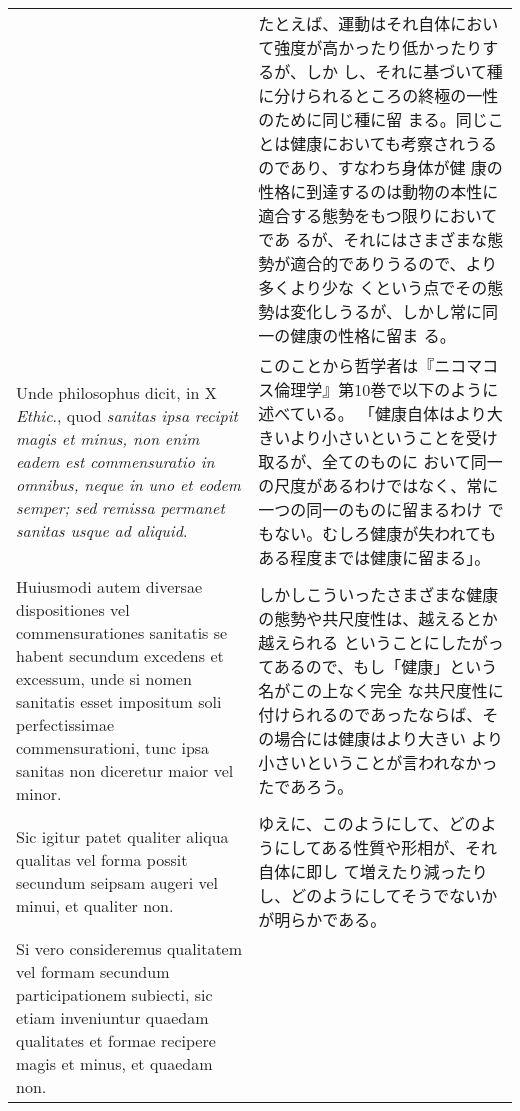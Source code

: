\documentclass[10pt]{jsarticle} %
\begin{document}
\begin{longtable}{p{21em}p{21em}}
&

たとえば、運動はそれ自体において強度が高かったり低かったりするが、しか
 し、それに基づいて種に分けられるところの終極の一性のために同じ種に留
 まる。同じことは健康においても考察されうるのであり、すなわち身体が健
 康の性格に到達するのは動物の本性に適合する態勢をもつ限りにおいてであ
 るが、それにはさまざまな態勢が適合的でありうるので、より多くより少な
 くという点でその態勢は変化しうるが、しかし常に同一の健康の性格に留ま
 る。

\\


Unde philosophus dicit, in X {\itshape Ethic}., quod {\itshape sanitas ipsa
recipit magis et minus, non enim eadem est commensuratio in omnibus,
neque in uno et eodem semper; sed remissa permanet sanitas usque ad
aliquid}. 


&

このことから哲学者は『ニコマコス倫理学』第10巻で以下のように述べている。
 「健康自体はより大きいより小さいということを受け取るが、全てのものに
 おいて同一の尺度があるわけではなく、常に一つの同一のものに留まるわけ
 でもない。むしろ健康が失われてもある程度までは健康に留まる」。

\\


Huiusmodi autem diversae dispositiones vel commensurationes
sanitatis se habent secundum excedens et excessum, unde si nomen
sanitatis esset impositum soli perfectissimae commensurationi, tunc
ipsa sanitas non diceretur maior vel minor. 


&

しかしこういったさまざまな健康の態勢や共尺度性は、越えるとか越えられる
 ということにしたがってあるので、もし「健康」という名がこの上なく完全
 な共尺度性に付けられるのであったならば、その場合には健康はより大きい
 より小さいということが言われなかったであろう。

\\


Sic igitur patet qualiter
aliqua qualitas vel forma possit secundum seipsam augeri vel minui, et
qualiter non. 


&

ゆえに、このようにして、どのようにしてある性質や形相が、それ自体に即し
 て増えたり減ったりし、どのようにしてそうでないかが明らかである。

\\


Si vero consideremus qualitatem vel formam secundum
participationem subiecti, sic etiam inveniuntur quaedam qualitates et
formae recipere magis et minus, et quaedam non. 



\end{longtable}
\end{document}
